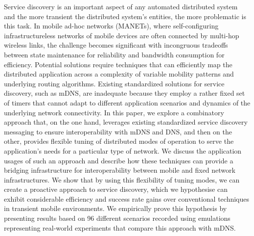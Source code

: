 \sloppypar Service discovery is an important aspect of any automated distributed system and the more transient the distributed system's entities, the more problematic is this task.  In mobile ad-hoc networks (MANETs), where self-configuring infrastructureless networks of mobile devices are often connected by multi-hop wireless links, the challenge becomes significant with incongruous tradeoffs between state maintenance for reliability and bandwidth consumption for efficiency.  Potential solutions require techniques that can efficiently map the distributed application across a complexity of variable mobility patterns and underlying routing algorithms.  Existing standardized solutions for service discovery, such as mDNS, are inadequate because they employ a rather fixed set of timers that cannot adapt to different application scenarios and dynamics of the underlying network connectivity.   In this paper, we explore a combinatory approach that, on the one hand, leverages existing standardized service discovery messaging to ensure interoperability with mDNS and DNS, and then on the other,  provides flexible tuning of distributed modes of operation to serve the application's needs for a particular type of network. We discuss the application usages of such an approach and describe how these techniques can provide a bridging infrastructure for interoperability between mobile and fixed network infrastructures.  We show that by using this flexibility of tuning modes, we can create a proactive approach to service discovery, which we hypothesise can exhibit considerable efficiency and success rate gains over conventional techniques in transient mobile environments. We empirically prove this hypothesis by presenting results based on 96 different scenarios recorded using emulations representing real-world experiments that compare this approach with mDNS.      
